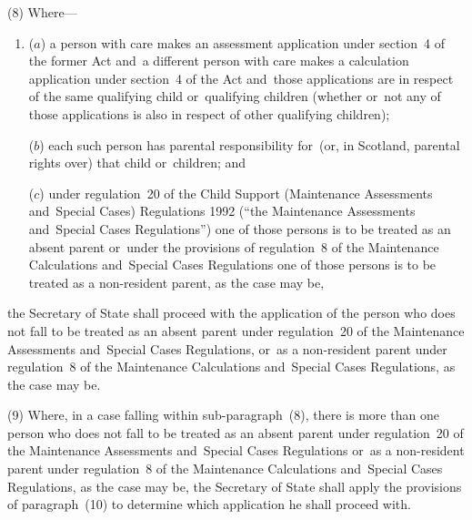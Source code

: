 \documentclass[12pt,a4paper]{article}
\begin{document}

(8) Where—
\begin{enumerate}\item[]
($a$) a person with care makes an assessment application under section~4 of the former Act and~a different person with care makes a calculation application under section~4 of the Act and~those applications are in respect of the same qualifying child or~qualifying children (whether or~not any of those applications is also in respect of other qualifying children);

($b$) each such person has parental responsibility for~(or, in Scotland, parental rights over) that child or~children; and

($c$) under regulation~20 of the Child Support (Maintenance Assessments and~Special Cases) Regulations 1992 (“the Maintenance Assessments and~Special Cases Regulations”) one of those persons is to be treated as an absent parent or~under the provisions of regulation~8 of the Maintenance Calculations and~Special Cases Regulations one of those persons is to be treated as a non-resident parent, as the case may be,
\end{enumerate}
the Secretary of State shall proceed with the application of the person who does not fall to be treated as an absent parent under regulation~20 of the Maintenance Assessments and~Special Cases Regulations, or~as a non-resident parent under regulation~8 of the Maintenance Calculations and~Special Cases Regulations, as the case may be.

(9) Where, in a case falling within sub-paragraph~(8), there is more than one person who does not fall to be treated as an absent parent under regulation~20 of the Maintenance Assessments and~Special Cases Regulations or~as a non-resident parent under regulation~8 of the Maintenance Calculations and~Special Cases Regulations, as the case may be, the Secretary of State shall apply the provisions of paragraph~(10) to determine which application he shall proceed with.
\end{document}
